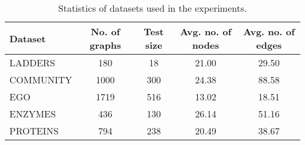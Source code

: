 \begin{table}[h!]
    \footnotesize
    \centering
    \caption{Statistics of datasets used in the experiments.}
    \label{tab:generation-datasets}
    \renewcommand{\arraystretch}{1.2}
    \begin{tabular}{lcccc}
        \toprule
         \textbf{Dataset} & \textbf{No. of graphs} & \textbf{Test size} & \textbf{Avg. no. of nodes} & \textbf{Avg. no. of edges}\\
         \midrule
         LADDERS & 180 & 18 & 21.00 & 29.50 \\
         COMMUNITY & 1000 & 300 & 24.38 & 88.58 \\
         EGO & 1719 & 516 & 13.02 & 18.51 \\
         ENZYMES & 436 & 130 & 26.14 & 51.16 \\
         PROTEINS & 794 & 238 & 20.49 & 38.67 \\
        \bottomrule
    \end{tabular}
\end{table}